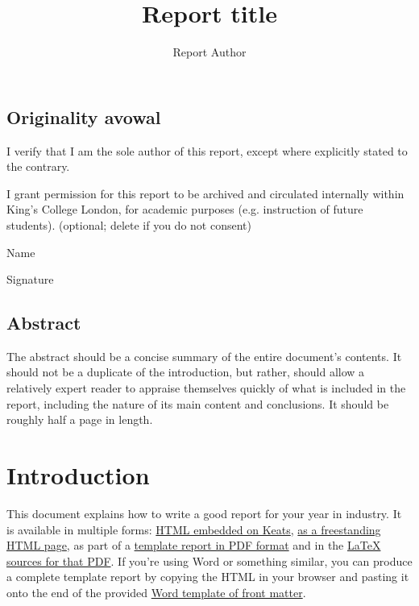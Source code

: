 \documentclass[12pt,a4paper,twoside,openright]{report}
\begin{document}

\title{Report title}
\author{Report Author}
%

\setcounter{page}{2} %
\pagestyle{empty}
\cleardoublepage

\vspace*{60mm}
\section*{Originality avowal}
\vspace{10mm}

I verify that I am the sole author of this report, except where explicitly
stated to the contrary.

I grant permission for this report to be archived and circulated
internally within King's College London, for academic purposes
(e.g. instruction of future students).
    {\footnotesize (optional; delete if you do not consent)}\\

\medskip

Name\\

\medskip

Signature\\

\bigskip

\section*{Abstract}

The abstract should be a concise summary of the entire document's contents.
It should not be a duplicate of the introduction, but rather,
should allow a relatively expert reader to appraise themselves quickly
of what is included in the report,
including the nature of its main content and conclusions.
It should be roughly half a page in length.

\cleardoublepage

\tableofcontents
\listoffigures
\listoftables

\chapter{Introduction}

This document explains how to write a good report for your year in industry.
It is available in multiple forms:
\href{https://keats.kcl.ac.uk/course/view.php?id=75967&section=27}{HTML embedded on Keats},
\href{https://nms.kcl.ac.uk/stephen.kell/yini/report-keats.html}{as a freestanding HTML page},
as part of a \href{https://nms.kcl.ac.uk/stephen.kell/yini/report.pdf}{template report in PDF format}
and in the \href{https://nms.kcl.ac.uk/stephen.kell/yini/reportsrc.zip}{LaTeX sources for that PDF}.
If you're using Word or something similar,
you can produce a complete template report
by copying the HTML in your browser and pasting it onto the end of the provided
\href{https://nms.kcl.ac.uk/stephen.kell/yini/report-word-frontmatter.docx}{Word template of front matter}.
\end{document}
